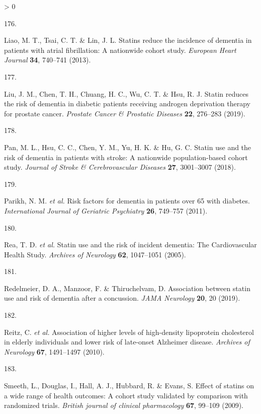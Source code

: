 \documentclass[a4paper, twoside]{templates/ociamthesis}
\newlength{\cslhangindent}
\newlength{\csllabelwidth}
\newenvironment{CSLReferences}[3] %
 {%
  \setlength{\parindent}{0pt}
  \ifodd #1 \everypar{\setlength{\hangindent}{\cslhangindent}}\ignorespaces\fi
  \ifnum #2 > 0
  \setlength{\parskip}{#2\baselineskip}
  \fi
 }%
 {}
\newcommand{\CSLLeftMargin}[1]{\parbox[t]{\maxof{\widthof{#1}}{\csllabelwidth}}{#1}}
\newcommand{\CSLRightInline}[1]{\parbox[t]{\linewidth - \csllabelwidth}{#1}}
\begin{document}
\begin{CSLReferences}{0}{0}
\leavevmode\hypertarget{ref-liao2013}{}%
\CSLLeftMargin{176. }
\CSLRightInline{Liao, M. T., Tsai, C. T. \& Lin, J. L. Statins reduce the incidence of dementia in patients with atrial fibrillation: A nationwide cohort study. \emph{European Heart Journal} \textbf{34}, 740--741 (2013).}

\leavevmode\hypertarget{ref-liu2019a}{}%
\CSLLeftMargin{177. }
\CSLRightInline{Liu, J. M., Chen, T. H., Chuang, H. C., Wu, C. T. \& Hsu, R. J. Statin reduces the risk of dementia in diabetic patients receiving androgen deprivation therapy for prostate cancer. \emph{Prostate Cancer \& Prostatic Diseases} \textbf{22}, 276--283 (2019).}

\leavevmode\hypertarget{ref-pan2018}{}%
\CSLLeftMargin{178. }
\CSLRightInline{Pan, M. L., Hsu, C. C., Chen, Y. M., Yu, H. K. \& Hu, G. C. Statin use and the risk of dementia in patients with stroke: A nationwide population-based cohort study. \emph{Journal of Stroke \& Cerebrovascular Diseases} \textbf{27}, 3001--3007 (2018).}

\leavevmode\hypertarget{ref-parikh2011}{}%
\CSLLeftMargin{179. }
\CSLRightInline{Parikh, N. M. \emph{et al.} Risk factors for dementia in patients over 65 with diabetes. \emph{International Journal of Geriatric Psychiatry} \textbf{26}, 749--757 (2011).}

\leavevmode\hypertarget{ref-rea2005a}{}%
\CSLLeftMargin{180. }
\CSLRightInline{Rea, T. D. \emph{et al.} Statin use and the risk of incident dementia: The {Cardiovascular Health Study}. \emph{Archives of Neurology} \textbf{62}, 1047--1051 (2005).}

\leavevmode\hypertarget{ref-redelmeier2019}{}%
\CSLLeftMargin{181. }
\CSLRightInline{Redelmeier, D. A., Manzoor, F. \& Thiruchelvam, D. Association between statin use and risk of dementia after a concussion. \emph{JAMA Neurology} \textbf{20}, 20 (2019).}

\leavevmode\hypertarget{ref-reitz2010}{}%
\CSLLeftMargin{182. }
\CSLRightInline{Reitz, C. \emph{et al.} Association of higher levels of high-density lipoprotein cholesterol in elderly individuals and lower risk of late-onset {Alzheimer} disease. \emph{Archives of Neurology} \textbf{67}, 1491--1497 (2010).}

\leavevmode\hypertarget{ref-smeeth2009a}{}%
\CSLLeftMargin{183. }
\CSLRightInline{Smeeth, L., Douglas, I., Hall, A. J., Hubbard, R. \& Evans, S. Effect of statins on a wide range of health outcomes: A cohort study validated by comparison with randomized trials. \emph{British journal of clinical pharmacology} \textbf{67}, 99--109 (2009).}


\end{CSLReferences}
\end{document}
